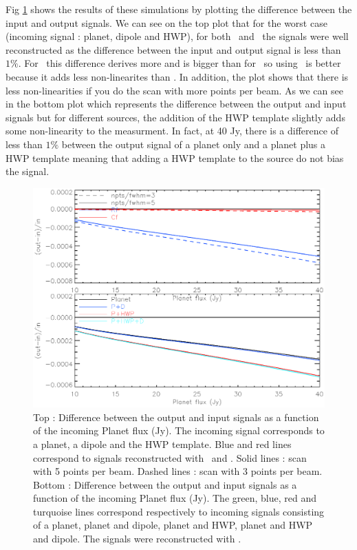 Fig \ref{fig:diff-rf-cf} shows the results of these simulations by plotting the difference between the input and output signals. We can see on the top plot that for the worst case (incoming signal : planet, dipole and HWP), for both \rf\ and \cf\ the signals were well reconstructed as the difference between the input and output signal is less than $ 1 \%$. For \rf\ this difference derives more and is bigger than for \cf\, so using \cf\ is better because it adds less non-linearites than \rf . In addition, the plot shows that there is less non-linearities if you do the scan with more points per beam. As we can see in the bottom plot which represents the difference between the output and input signals but for different sources, the addition of the HWP template slightly adds some non-linearity to the measurment. In fact, at 40 Jy, there is a difference of less than $1 \%$ between the output signal of a planet only and a planet plus a HWP template meaning that adding a HWP template to the source do not bias the signal.

\begin{figure}[h]
  \includegraphics[clip, angle=0, width=\columnwidth]{Figures/diff-rf-cf.eps}
  \caption{Top : Difference between the output and input signals as a function of the incoming Planet flux (Jy). The incoming signal corresponds to a planet, a dipole and the HWP template. Blue and red lines correspond to signals reconstructed with \rf\ and \cf. Solid lines : scan with 5 points per beam. Dashed lines : scan with 3 points per beam.
    Bottom : Difference between the output and input signals as a function of the incoming Planet flux (Jy). The green, blue, red and turquoise lines correspond respectively to incoming signals consisting of a planet, planet and dipole, planet and HWP, planet and HWP and dipole. The signals were reconstructed with \rf. }
  \label{fig:diff-rf-cf}
\end{figure}

